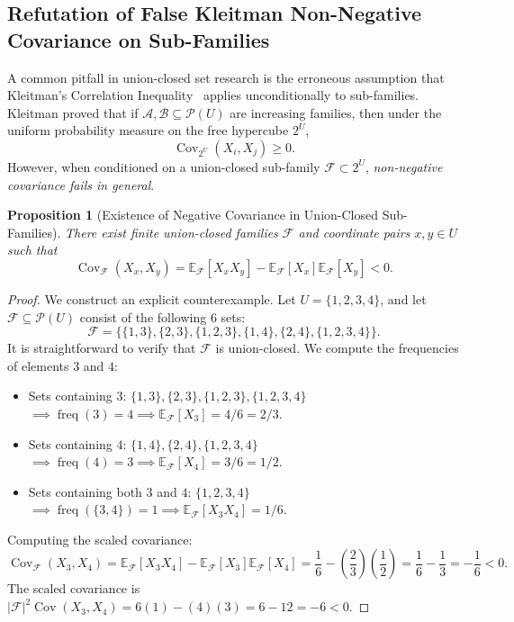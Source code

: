 \documentclass[11pt,a4paper]{article}
\theoremstyle{plain}
\newtheorem{proposition}[theorem]{Proposition}
\theoremstyle{definition}
\theoremstyle{remark}
\newcommand{\F}{\mathcal{F}}
\newcommand{\freq}{\operatorname{freq}}
\newcommand{\E}{\mathbb{E}}
\newcommand{\Cov}{\operatorname{Cov}}
\begin{document}
\subsection{Refutation of False Kleitman Non-Negative Covariance on Sub-Families}

A common pitfall in union-closed set research is the erroneous assumption that Kleitman's Correlation Inequality~\cite{kleitman1966} applies unconditionally to sub-families. Kleitman proved that if $\mathcal{A}, \mathcal{B} \subseteq \mathcal{P}(U)$ are increasing families, then under the uniform probability measure on the free hypercube $2^U$,
\begin{equation}
\Cov_{2^U}(X_i, X_j) \ge 0.
\end{equation}
However, when conditioned on a union-closed sub-family $\F \subset 2^U$, \emph{non-negative covariance fails in general}.

\begin{proposition}[Existence of Negative Covariance in Union-Closed Sub-Families]
There exist finite union-closed families $\F$ and coordinate pairs $x, y \in U$ such that
\begin{equation}
\Cov_\F(X_x, X_y) = \E_\F[X_x X_y] - \E_\F[X_x] \E_\F[X_y] < 0.
\end{equation}
\end{proposition}
\begin{proof}
We construct an explicit counterexample. Let $U = \{1, 2, 3, 4\}$, and let $\F \subseteq \mathcal{P}(U)$ consist of the following 6 sets:
\begin{equation}
\F = \{\{1, 3\}, \{2, 3\}, \{1, 2, 3\}, \{1, 4\}, \{2, 4\}, \{1, 2, 3, 4\}\}.
\end{equation}
It is straightforward to verify that $\F$ is union-closed. We compute the frequencies of elements $3$ and $4$:
\begin{itemize}
    \item Sets containing $3$: $\{1, 3\}, \{2, 3\}, \{1, 2, 3\}, \{1, 2, 3, 4\}$ $\implies \freq(3) = 4 \implies \E_\F[X_3] = 4/6 = 2/3$.
    \item Sets containing $4$: $\{1, 4\}, \{2, 4\}, \{1, 2, 3, 4\}$ $\implies \freq(4) = 3 \implies \E_\F[X_4] = 3/6 = 1/2$.
    \item Sets containing both $3$ and $4$: $\{1, 2, 3, 4\}$ $\implies \freq(\{3, 4\}) = 1 \implies \E_\F[X_3 X_4] = 1/6$.
\end{itemize}
Computing the scaled covariance:
\begin{equation}
\Cov_\F(X_3, X_4) = \E_\F[X_3 X_4] - \E_\F[X_3] \E_\F[X_4] = \frac{1}{6} - \left(\frac{2}{3}\right)\left(\frac{1}{2}\right) = \frac{1}{6} - \frac{1}{3} = -\frac{1}{6} < 0.
\end{equation}
The scaled covariance is $|\F|^2 \Cov(X_3, X_4) = 6(1) - (4)(3) = 6 - 12 = -6 < 0$.
\end{proof}
\end{document}
